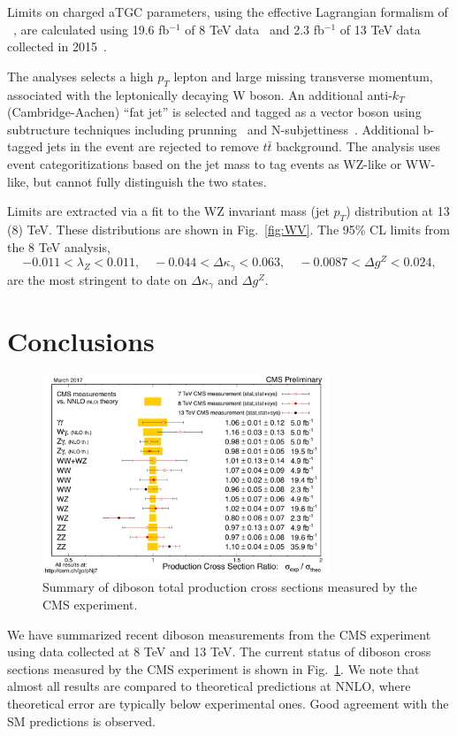 \documentclass[10pt]{article}
\begin{document}
Limits on charged aTGC parameters, using the effective Lagrangian formalism 
of ~\cite{Hagiwara:1993ck}, are calculated using 19.6 fb$^{-1}$ of 8 TeV 
data~\cite{CMS:2017ruh}
and 2.3 fb$^{-1}$ of 13 TeV data collected in 2015~\cite{Sirunyan:2017bey}.

The analyses selects a high $p_{T}$ lepton and large missing transverse momentum, 
associated with the leptonically decaying W boson. An additional anti-$k_{T}$
(Cambridge-Aachen) ``fat jet'' is selected and tagged as a vector boson using
subtructure techniques including prunning~\cite{Ellis:2009me} and 
N-subjettiness~\cite{Thaler:2010tr}. Additional b-tagged jets in the event are 
rejected to remove $t\bar{t}$ background. The analysis uses event categoritizations
based on the jet mass to tag events as WZ-like or WW-like, but cannot fully 
distinguish the two states.

Limits are extracted via a fit to the WZ invariant mass (jet $p_{T}$) distribution at 13 (8) TeV.
These distributions are shown in Fig.~\ref{fig:WV}.
The 95\% CL limits from the 8 TeV analysis,
\begin{equation}
  -0.011 < \lambda_{Z} < 0.011, \quad -0.044 < \Delta\kappa_{\gamma} < 0.063, \quad -0.0087 < \Delta g^{Z} < 0.024,
\end{equation}
are the most stringent to date on $\Delta\kappa_\gamma$ and $\Delta g^{Z}$.

\section{Conclusions}
\begin{figure}[htb]
  \centering
    \includegraphics[height=2.35in]{figures/CrossSectionSummary.pdf}
  \caption{ Summary of diboson total production cross sections measured by the CMS experiment. }
  \label{fig:xsecs}
\end{figure}


We have summarized recent diboson measurements from the CMS experiment using
data collected at 8 TeV and 13 TeV. The current status of diboson cross sections 
measured by the CMS experiment is shown in Fig.~\ref{fig:xsecs}. We note that 
almost all results are compared to theoretical predictions at NNLO, where theoretical 
error are typically below experimental ones. 
Good agreement with the SM predictions is
observed. 



\end{document}
